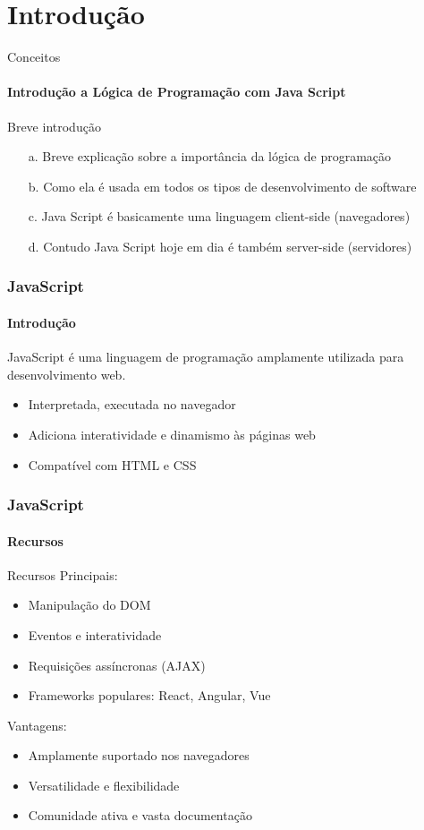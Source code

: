 \documentclass[13pt, xcolor={dvipsnames,svgnames}, portuguese]{beamer}
\begin{document}
\section{Introdução}
\begin{frame}{Conceitos}
\framesubtitle{Introdução a Lógica de Programação com Java Script}
	\begin{block}{Breve introdução}
		\begin{itemize}
		  \item[a.] Breve explicação sobre a importância da lógica de programação 
		  \pause
		  \item[b.] Como ela é usada em todos os tipos de desenvolvimento de software
		   \pause		  
		  \item[c.] Java Script é basicamente uma linguagem client-side (navegadores)
		  \pause
		  \item[d.] Contudo Java Script hoje em dia é também server-side (servidores)
		\end{itemize}
	\end{block} 
\end{frame}


\begin{frame}
\frametitle{JavaScript}
\framesubtitle{Introdução}

JavaScript é uma linguagem de programação amplamente utilizada para desenvolvimento web.

\begin{itemize}
  \item Interpretada, executada no navegador
  \item Adiciona interatividade e dinamismo às páginas web
  \item Compatível com HTML e CSS
\end{itemize}

\end{frame}

\begin{frame}
\frametitle{JavaScript}
\framesubtitle{Recursos}

Recursos Principais:

\begin{itemize}
  \item Manipulação do DOM
  \item Eventos e interatividade
  \item Requisições assíncronas (AJAX)
  \item Frameworks populares: React, Angular, Vue
\end{itemize}

Vantagens:

\begin{itemize}
  \item Amplamente suportado nos navegadores
  \item Versatilidade e flexibilidade
  \item Comunidade ativa e vasta documentação
\end{itemize}
\end{frame}
\end{document}
